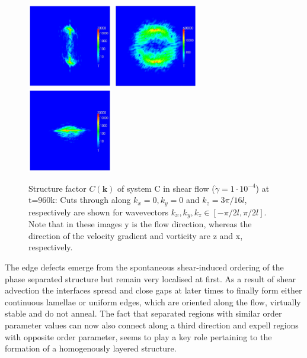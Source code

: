 \documentclass[8.5pt,twoside,twocolumn]{article}
\begin{document}
\begin{figure}[!]
\centering
\includegraphics[angle=0,width=0.33\textwidth]{ck_x-slice_run788_960.jpg}
\includegraphics[angle=0,width=0.33\textwidth]{ck_y-slice_run788_960.jpg}
\includegraphics[angle=0,width=0.33\textwidth]{ck_z-slice_run788_960.jpg}
\caption{Structure factor $C({\mathbf k})$ of system C in shear flow ($\dot{\gamma}=1\cdot10^{-4}$) at t=960k: Cuts through along $k_x=0,k_y=0$ and $k_z=3\pi/16 l$, respectively are shown for wavevectors $k_x, k_y, k_z\in[-\pi/2 l,\pi/2 l]$. Note that in these images y is the flow direction, whereas the direction of the velocity gradient and vorticity are z and x, respectively.}
\label{fig14}
\end{figure}
The edge defects emerge from the spontaneous shear-induced ordering of the phase separated structure but remain very localised at first.
As a result of shear advection the interfaces spread and close gaps at later times to finally form either continuous lamellae or uniform edges, which are oriented along the flow, virtually stable and do not anneal.
The fact that separated regions with similar order parameter values can now also connect along a third direction and expell regions with opposite order parameter, seems to play a key role pertaining to the formation of a homogenously layered structure.
\end{document}
